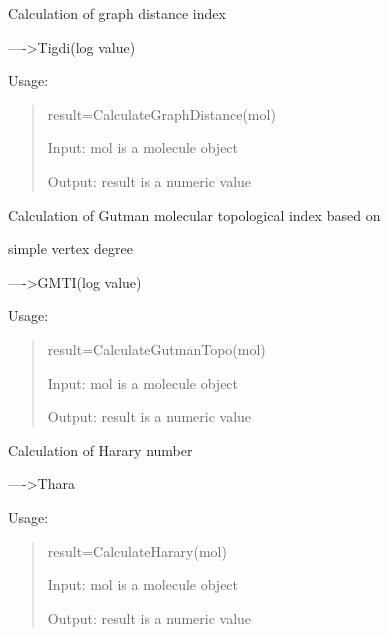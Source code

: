\documentclass[letterpaper,10pt,english]{sphinxmanual}
\begin{document}

\begin{fulllineitems}
\label{reference/topology:topology.CalculateGraphDistance}
Calculation of graph distance index

----\textgreater{}Tigdi(log value)

Usage:
\begin{quote}

result=CalculateGraphDistance(mol)

Input: mol is a molecule object

Output: result is a numeric value
\end{quote}

\end{fulllineitems}


\begin{fulllineitems}
\label{reference/topology:topology.CalculateGutmanTopo}
Calculation of Gutman molecular topological index based on

simple vertex degree

----\textgreater{}GMTI(log value)

Usage:
\begin{quote}

result=CalculateGutmanTopo(mol)

Input: mol is a molecule object

Output: result is a numeric value
\end{quote}

\end{fulllineitems}


\begin{fulllineitems}
\label{reference/topology:topology.CalculateHarary}
Calculation of Harary number

----\textgreater{}Thara

Usage:
\begin{quote}

result=CalculateHarary(mol)

Input: mol is a molecule object

Output: result is a numeric value
\end{quote}

\end{fulllineitems}
\end{document}
